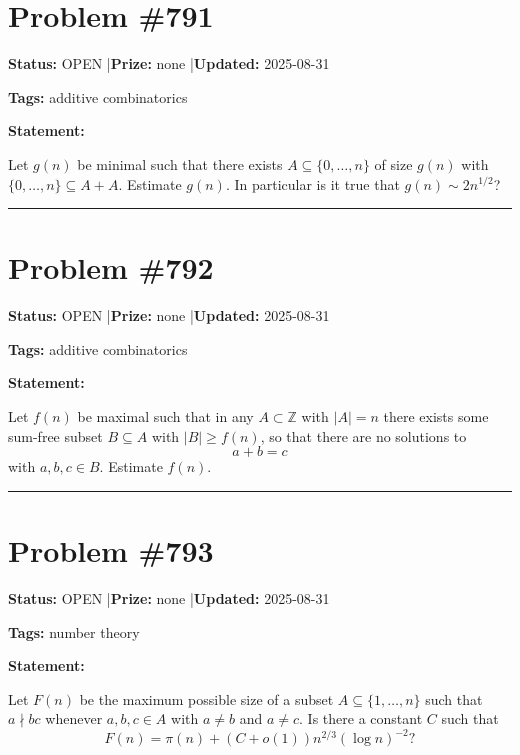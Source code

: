 \documentclass{article}
\begin{document}
\section{Problem \#791}
\label{prob:791}

\noindent\textbf{Status:} OPEN \quad|\quad \textbf{Prize:} none \quad|\quad \textbf{Updated:} 2025-08-31

\noindent\textbf{Tags:} additive combinatorics

\medskip

\noindent\textbf{Statement:}

Let $g(n)$ be minimal such that there exists $A\subseteq \{0,\ldots,n\}$ of size $g(n)$ with $\{0,\ldots,n\}\subseteq A+A$. Estimate $g(n)$. In particular is it true that $g(n)\sim 2n^{1/2}$?

\noindent\rule{\linewidth}{0.4pt}


\section{Problem \#792}
\label{prob:792}

\noindent\textbf{Status:} OPEN \quad|\quad \textbf{Prize:} none \quad|\quad \textbf{Updated:} 2025-08-31

\noindent\textbf{Tags:} additive combinatorics

\medskip

\noindent\textbf{Statement:}

Let $f(n)$ be maximal such that in any $A\subset \mathbb{Z}$ with $\lvert A\rvert=n$ there exists some sum-free subset $B\subseteq A$ with $\lvert B\rvert \geq f(n)$, so that there are no solutions to\[a+b=c\]with $a,b,c\in B$. Estimate $f(n)$.

\noindent\rule{\linewidth}{0.4pt}


\section{Problem \#793}
\label{prob:793}

\noindent\textbf{Status:} OPEN \quad|\quad \textbf{Prize:} none \quad|\quad \textbf{Updated:} 2025-08-31

\noindent\textbf{Tags:} number theory

\medskip

\noindent\textbf{Statement:}

Let $F(n)$ be the maximum possible size of a subset $A\subseteq\{1,\ldots,n\}$ such that $a\nmid bc$ whenever $a,b,c\in A$ with $a\neq b$ and $a\neq c$. Is there a constant $C$ such that\[F(n)=\pi(n)+(C+o(1))n^{2/3}(\log n)^{-2}?\]
\end{document}
